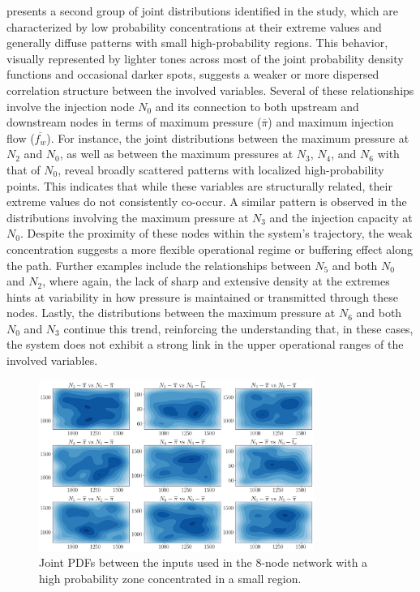  presents a second group of joint distributions identified in the study, which are characterized by low probability concentrations at their extreme values and generally diffuse patterns with small high-probability regions. This behavior, visually represented by lighter tones across most of the joint probability density functions and occasional darker spots, suggests a weaker or more dispersed correlation structure between the involved variables. Several of these relationships involve the injection node $N_0$ and its connection to both upstream and downstream nodes in terms of maximum pressure ($\overline{\pi}$) and maximum injection flow ($\overline{f_w}$). For instance, the joint distributions between the maximum pressure at $N_2$ and $N_0$, as well as between the maximum pressures at $N_3$, $N_4$, and $N_6$ with that of $N_0$, reveal broadly scattered patterns with localized high-probability points. This indicates that while these variables are structurally related, their extreme values do not consistently co-occur. A similar pattern is observed in the distributions involving the maximum pressure at $N_3$ and the injection capacity at $N_0$. Despite the proximity of these nodes within the system’s trajectory, the weak concentration suggests a more flexible operational regime or buffering effect along the path. Further examples include the relationships between $N_5$ and both $N_0$ and $N_2$, where again, the lack of sharp and extensive density at the extremes hints at variability in how pressure is maintained or transmitted through these nodes. Lastly, the distributions between the maximum pressure at $N_6$ and both $N_0$ and $N_3$ continue this trend, reinforcing the understanding that, in these cases, the system does not exhibit a strong link in the upper operational ranges of the involved variables.


\begin{figure}[h]
    \begin{center}
        \includegraphics[width=0.8\textwidth]{figures/Chapter_NonLinealCensnet/PDF_inputs_inputs_no_mode.png}
    \end{center}
    \caption{Joint PDFs between the inputs used in the 8-node network with a high probability zone concentrated in a small region.}
    \label{fig:joint_distributions_input_input_no_mode}
\end{figure}

